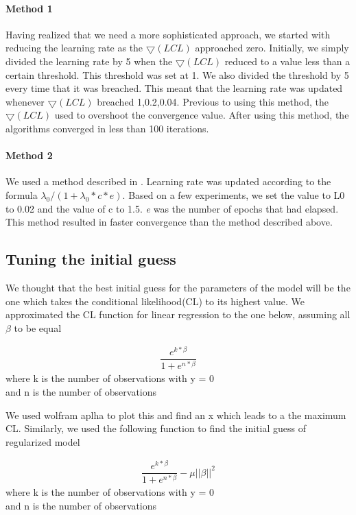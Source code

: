 \documentclass{acm_proc_article-sp}
\begin{document}
\paragraph{Method 1}
Having realized that we need a more sophisticated approach, we started with reducing the learning rate as the $\bigtriangledown(LCL)$ approached zero. Initially, we simply divided the learning rate by 5 when the $\bigtriangledown(LCL)$ reduced to a value less than a certain threshold. This threshold was set at 1. We also divided the threshold by 5 every time that it was breached. This meant that the learning rate was updated whenever $\bigtriangledown(LCL)$ breached 1,0.2,0.04. Previous to using this method, the $\bigtriangledown(LCL)$ used to overshoot the convergence value. After using this method, the algorithms converged in less than 100 iterations.
\paragraph{Method 2}
We used a method described in \cite{settingHyperparameters}. Learning rate was updated according to the formula $\lambda_0/(1+\lambda_0*c*e)$. Based on a few experiments, we set the value to L0 to 0.02 and the value of c to 1.5. \textit{e} was the number of epochs that had elapsed. This method resulted in faster convergence than the method described above.

\subsection{Tuning the initial guess}
We thought that the best initial guess for the parameters of the model will be the one which takes the conditional likelihood(CL) to its highest value. We approximated the CL function for linear regression to the one below, assuming all $\beta$ to be equal

\begin{align}
\dfrac{e^{k * \beta}}{1 + e^{n * \beta}}
\end{align}
where k is the number of observations with y = 0\\
and n is the number of observations


We used wolfram aplha\cite{} to plot this and find an x which leads to a the maximum CL. Similarly, we used the following function to find the initial guess of regularized model

\begin{align}
\dfrac{e^{k * \beta}}{1 + e^{n * \beta}} - \mu||\beta||^2
\end{align}
where k is the number of observations with y = 0\\
and n is the number of observations
\end{document}
